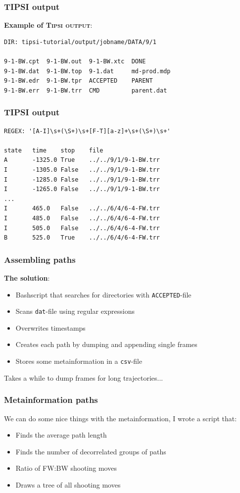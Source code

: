 \documentclass[hyperref={pdfpagelabels=false}]{beamer}
\begin{document}
\begin{frame}[fragile]
\frametitle{\textsc{TIPSI} output}
\textbf{Example of \textsc{Tipsi output}}:
\begin{lstlisting}
DIR: tipsi-tutorial/output/jobname/DATA/9/1

9-1-BW.cpt  9-1-BW.out  9-1-BW.xtc  DONE
9-1-BW.dat  9-1-BW.top  9-1.dat     md-prod.mdp
9-1-BW.edr  9-1-BW.tpr  ACCEPTED    PARENT
9-1-BW.err  9-1-BW.trr  CMD         parent.dat
\end{lstlisting}
\end{frame}

\begin{frame}[fragile]
\frametitle{\textsc{TIPSI} output}
\begin{lstlisting}
REGEX: '[A-I]\s+(\S+)\s+[F-T][a-z]+\s+(\S+)\s+'

state   time    stop    file
A       -1325.0 True    ../../9/1/9-1-BW.trr
I       -1305.0 False   ../../9/1/9-1-BW.trr
I       -1285.0 False   ../../9/1/9-1-BW.trr
I       -1265.0 False   ../../9/1/9-1-BW.trr
...
I       465.0   False   ../../6/4/6-4-FW.trr
I       485.0   False   ../../6/4/6-4-FW.trr
I       505.0   False   ../../6/4/6-4-FW.trr
B       525.0   True    ../../6/4/6-4-FW.trr
\end{lstlisting}
\end{frame}

\begin{frame}
\frametitle{Assembling paths}
\textbf{The solution}: 
\begin{itemize}
\item Bashscript that searches for directories with \texttt{ACCEPTED}-file
\item Scans \texttt{dat}-file using regular expressions
\item Overwrites timestamps
\item Creates each path by dumping and appending single frames
\item Stores some metainformation in a \texttt{csv}-file
\end{itemize}
Takes a while to dump frames for long trajectories...
\end{frame}

\begin{frame}
\frametitle{Metainformation paths} 
We can do some nice things with the metainformation, I wrote a script that:
\begin{itemize}
\item Finds the average path length
\item Finds the number of decorrelated groups of paths
\item Ratio of FW:BW shooting moves
\item Draws a tree of all shooting moves
\end{itemize}
\end{frame}
\end{document}
